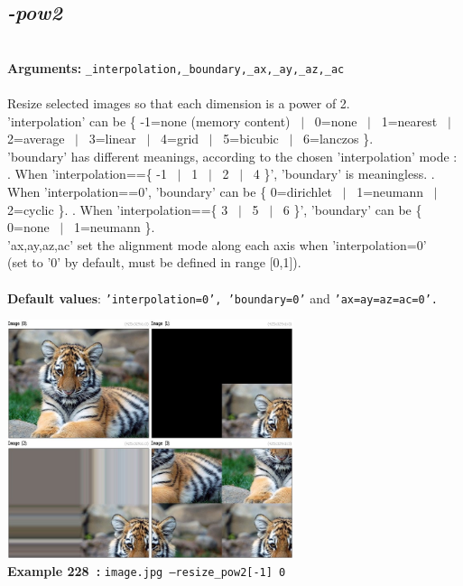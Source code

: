 \documentclass[a4paper,11pt,twoside]{book}
\begin{document}
\subsection{\emph{-pow2} }\vspace*{-0.5em}
~\\\textbf{Arguments: } 
{\small \texttt{\_interpolation,\_boundary,\_ax,\_ay,\_az,\_ac}}\\~\\
Resize selected images so that each dimension is a power of 2.
~\\'interpolation' can be \{ -1=none (memory content) ~$|$~ 0=none ~$|$~ 1=nearest ~$|$~ 2=average ~$|$~ 3=linear ~$|$~ 4=grid ~$|$~ 5=bicubic ~$|$~ 6=lanczos \}.
~\\'boundary' has different meanings, according to the chosen 'interpolation' mode :
. When 'interpolation==\{ -1 ~$|$~ 1 ~$|$~ 2 ~$|$~ 4 \}', 'boundary' is meaningless.
. When 'interpolation==0', 'boundary' can be \{ 0=dirichlet ~$|$~ 1=neumann ~$|$~ 2=cyclic \}.
. When 'interpolation==\{ 3 ~$|$~ 5 ~$|$~ 6 \}', 'boundary' can be \{ 0=none ~$|$~ 1=neumann \}.
~\\'ax,ay,az,ac' set the alignment mode along each axis when 'interpolation=0'
~\\(set to '0' by default, must be defined in range [0,1]).
~\\~\\\textbf{Default values}: {\small \texttt{'interpolation=0', 'boundary=0'} and \texttt{'ax=ay=az=ac=0'.}}
\begin{center}\includegraphics[keepaspectratio=true,height=7cm,width=\textwidth]{img/gmic_def228.jpg}\\
{\footnotesize \textbf{Example 228~:} \texttt{image.jpg --resize\_pow2[-1] 0}}
\end{center}
\end{document}
